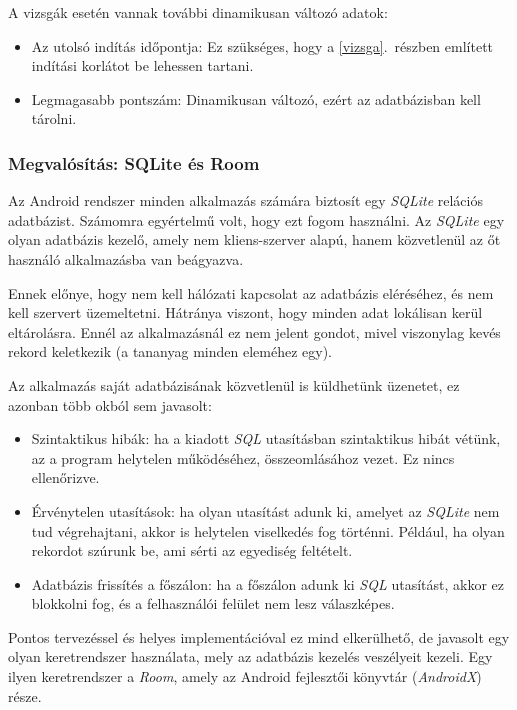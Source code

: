 \documentclass[12pt,a4paper]{article}
\begin{document}
	A vizsgák esetén vannak további dinamikusan változó adatok:
	
	\begin{itemize}
		\item Az utolsó indítás időpontja: Ez szükséges, hogy a \ref{vizsga}.\ részben említett indítási korlátot be lehessen tartani.
		\item Legmagasabb pontszám: Dinamikusan változó, ezért az adatbázisban kell tárolni.
	\end{itemize}
	
	\subsubsection{Megvalósítás: SQLite és Room}\label{sqlite_roon}

	Az Android rendszer minden alkalmazás számára biztosít egy \textit{SQLite} relációs adatbázist. Számomra egyértelmű volt, hogy ezt fogom használni. Az \textit{SQLite} egy olyan adatbázis kezelő, amely nem kliens-szerver alapú, hanem közvetlenül az őt használó alkalmazásba van beágyazva. 
	
	Ennek előnye, hogy nem kell hálózati kapcsolat az adatbázis eléréséhez, és nem kell szervert üzemeltetni. Hátránya viszont, hogy minden adat lokálisan kerül eltárolásra. Ennél az alkalmazásnál ez nem jelent gondot, mivel viszonylag kevés rekord keletkezik (a tananyag minden eleméhez egy).
	
	Az alkalmazás saját adatbázisának közvetlenül is küldhetünk üzenetet, ez azonban több okból sem javasolt:
	
	\begin{itemize}
		\item Szintaktikus hibák: ha a kiadott \textit{SQL} utasításban szintaktikus hibát vétünk, az a program helytelen működéséhez, összeomlásához vezet. Ez nincs ellenőrizve.
		\item Érvénytelen utasítások: ha olyan utasítást adunk ki, amelyet az \textit{SQLite} nem tud végrehajtani, akkor is helytelen viselkedés fog történni. Például, ha olyan rekordot szúrunk be, ami sérti az egyediség feltételt.
		\item Adatbázis frissítés a főszálon: ha a főszálon adunk ki \textit{SQL} utasítást, akkor ez blokkolni fog, és a felhasználói felület nem lesz válaszképes. 
	\end{itemize}

	Pontos tervezéssel és helyes implementációval ez mind elkerülhető, de javasolt egy olyan keretrendszer használata, mely az adatbázis kezelés veszélyeit kezeli. Egy ilyen keretrendszer a \textit{Room}, amely az Android fejlesztői könyvtár (\textit{AndroidX}) része.
	
\end{document}
